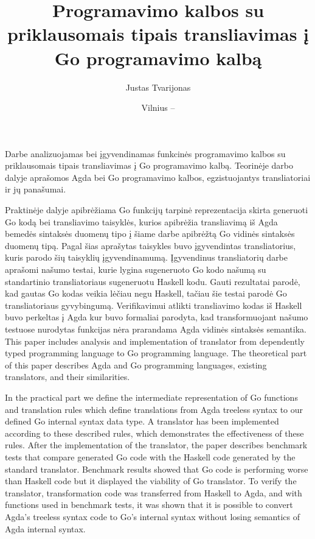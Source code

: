 \documentclass{VUMIFPSbakalaurinis}
\title{Programavimo kalbos su priklausomais tipais transliavimas į Go programavimo kalbą}
\author{Justas Tvarijonas}
\date{Vilnius – \the\year}
\begin{document}
\maketitle

Darbe analizuojamas bei įgyvendinamas funkcinės programavimo kalbos su priklausomais tipais transliavimas į Go programavimo kalbą. Teorinėje darbo dalyje aprašomos Agda bei Go programavimo kalbos, egzistuojantys transliatoriai ir jų panašumai. 
\par Praktinėje dalyje apibrėžiama Go funkcijų tarpinė reprezentacija skirta generuoti Go kodą bei transliavimo taisyklės, kurios apibrėžia transliavimą iš Agda bemedės sintaksės duomenų tipo į šiame darbe apibrėžtą Go vidinės sintaksės duomenų tipą. Pagal šias aprašytas taisykles buvo įgyvendintas transliatorius, kuris parodo šių taisyklių įgyvendinamumą. Įgyvendinus transliatorių darbe aprašomi našumo testai, kurie lygina sugeneruoto Go kodo našumą su standartinio transliatoriaus sugeneruotu Haskell kodu. Gauti rezultatai parodė, kad gautas Go kodas veikia lėčiau negu Haskell, tačiau šie testai parodė Go transliatoriaus gyvybingumą. Verifikavimui atlikti transliavimo kodas iš Haskell buvo perkeltas į Agda kur buvo formaliai parodyta, kad transformuojant našumo testuose nurodytas funkcijas nėra prarandama Agda vidinės sintaksės semantika.
This paper includes analysis and implementation of translator from dependently typed programming language to Go programming language. The theoretical part of this paper describes Agda and Go programming languages, existing translators, and their similarities. 
\par In the practical part we define the intermediate representation of Go functions and translation rules which define translations from Agda treeless syntax to our defined Go internal syntax data type. A translator has been implemented according to these described rules, which demonstrates the effectiveness of these rules. After the implementation of the translator, the paper describes benchmark tests that compare generated Go code with the Haskell code generated by the standard translator. Benchmark results showed that Go code is performing worse than Haskell code but it displayed the viability of Go translator. To verify the translator, transformation code was transferred from Haskell to Agda, and with functions used in benchmark tests, it was shown that it is possible to convert Agda's treeless syntax code to Go's internal syntax without losing semantics of Agda internal syntax.
\end{document}
